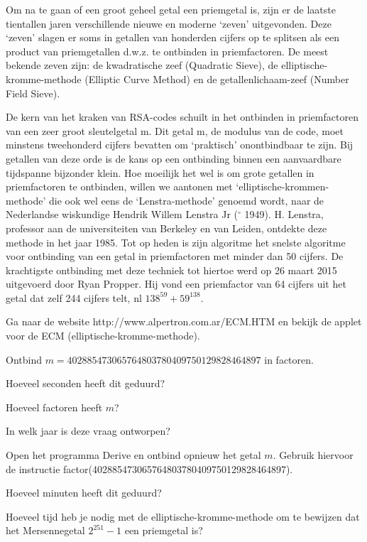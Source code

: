 Om na te gaan of een groot geheel getal een priemgetal is, zijn er de laatste tientallen jaren verschillende nieuwe en moderne ‘zeven’ uitgevonden. Deze ‘zeven’ slagen er soms in getallen van honderden cijfers op te splitsen als een product van priemgetallen d.w.z. te ontbinden in priemfactoren. De meest bekende zeven zijn: de kwadratische zeef (Quadratic Sieve), de elliptische-kromme-methode (Elliptic Curve Method) en de getallenlichaam-zeef (Number Field Sieve). 

De kern van het kraken van RSA-codes schuilt in het ontbinden in priemfactoren van een zeer groot sleutelgetal m. Dit getal m, de modulus van de code, moet minstens tweehonderd cijfers bevatten om ‘praktisch’ onontbindbaar te zijn. Bij getallen van deze orde is de kans op een ontbinding binnen een aanvaardbare tijdspanne bijzonder klein. Hoe moeilijk het wel is om grote getallen in priemfactoren te ontbinden, willen we aantonen met ‘elliptische-krommen-methode’ die ook wel eens de ‘Lenstra-methode’ genoemd wordt, naar de Nederlandse wiskundige Hendrik Willem Lenstra Jr ($^{\circ}$ 1949). H. Lenstra, professor aan de universiteiten van Berkeley en van Leiden, ontdekte deze methode in het jaar 1985. Tot op heden is zijn algoritme het snelste algoritme voor ontbinding van een getal in priemfactoren met minder dan 50 cijfers. De krachtigste ontbinding met deze techniek tot hiertoe werd op 26 maart 2015 uitgevoerd door Ryan Propper. Hij vond een priemfactor van 64 cijfers uit het getal dat zelf 244 cijfers telt, nl $138^{59}+59^{138}$.

\begin{oef}
Ga naar de website http://www.alpertron.com.ar/ECM.HTM en bekijk de applet voor de ECM (elliptische-kromme-methode).

\begin{enumoef}
\item Ontbind $m= 402885473065764803780409750129828464897$ in factoren.
\item Hoeveel seconden heeft dit geduurd?
\item Hoeveel factoren heeft $m$?
\item In welk jaar is deze vraag ontworpen?
\item Open het programma Derive en ontbind opnieuw het getal $m$. Gebruik hiervoor de instructie factor(402885473065764803780409750129828464897).
\item Hoeveel minuten heeft dit geduurd?
\item Hoeveel tijd heb je nodig met de elliptische-kromme-methode om te bewijzen dat het Mersennegetal $2^{251}-1$ een priemgetal is?
\end{enumoef}
\end{oef}

